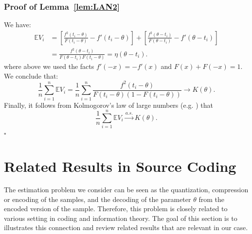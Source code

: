 \documentclass[letterpaper, conference, 11pt]{IEEEtran}      %
\newcommand*{\QEDA}{\hfill\ensuremath{\square}}
\begin{document}
\subsubsection*{Proof of Lemma~\ref{lem:LAN2}} 

We have:
\begin{align*}
\mathbb E V_i  & = \left[ \frac{ f^2\left(t_i-\theta \right)}{F\left( t_i-\theta \right)} - f' \left(t_i-\theta \right)  \right] 
+ \left[ \frac{ f^2\left(\theta-t_i \right)}{F\left( \theta - t_i \right)} - f' \left( \theta - t_i \right) \right] \\
& = \frac{f^2(\theta - t_i)}{F(\theta-t_i)F(t_i-\theta)} = \eta(\theta - t_i).
\end{align*}
where above we used the facts  $f'(-x) = -f'(x)$ and $F(x)+F(-x)=1$. We conclude that:
\[
\frac{1}{n} \sum_{i=1}^n \mathbb E V_i =  \frac{1}{n} \sum_{i=1}^n  \frac{f^2\left( t_i-\theta \right)} { F \left( t_i - \theta \right)\left(1-F \left( t_i - \theta \right) \right)} \rightarrow K(\theta).  
\]
Finally, it follows from Kolmogorov's law of large numbers (e.g. \cite[Thm. 10.2.3]{sen1994large}) that
\[
\frac{1}{n} \sum_{i=1}^n \mathbb E V_i \overset{a.s.}{\rightarrow} K(\theta). 
\]
\QEDA






\section{Related Results in Source Coding}
The estimation problem we consider can be seen as the quantization, compression or encoding of the samples, and the  decoding of the parameter $\theta$ from the encoded version of the sample. Therefore, this problem is closely related to various setting in coding and information theory. The goal of this section is to illustrates this connection and review related results that are relevant in our case. 

\end{document}
